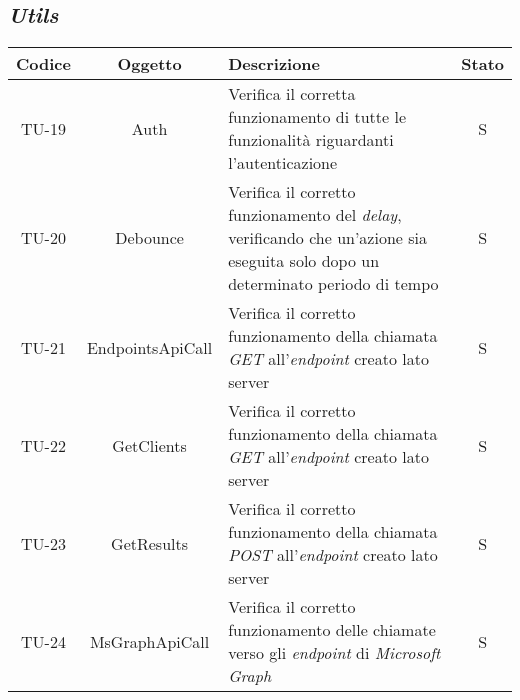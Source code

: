 \subsection*{\emph{Utils}}\label{subsec:test-unita-utils}


\begin{center}
  \label{tab:test-unita-utils}
  \begin{longtable}{|c|c|p{}|c|}
  \hline
  \textbf{Codice} & \textbf{Oggetto} & \textbf{Descrizione} & \textbf{Stato}\\
  \hline
  TU-19 &Auth &Verifica il corretta funzionamento di tutte le funzionalità riguardanti l'autenticazione & S \\
  \hline
  TU-20 &Debounce &Verifica il corretto funzionamento del \textit{delay}, verificando che un'azione sia eseguita solo dopo un determinato periodo di tempo &S \\
  \hline
  TU-21 &EndpointsApiCall &Verifica il corretto funzionamento della chiamata \textit{GET} all'\textit{endpoint} creato lato server &S \\
  \hline
  TU-22 &GetClients &Verifica il corretto funzionamento della chiamata \textit{GET} all'\textit{endpoint} creato lato server  &S \\
  \hline
  TU-23 &GetResults &Verifica il corretto funzionamento della chiamata \textit{POST} all'\textit{endpoint} creato lato server &S \\
  \hline
  TU-24 &MsGraphApiCall &Verifica il corretto funzionamento delle chiamate verso gli \textit{endpoint} di \textit{Microsoft Graph} &S \\
  \hline
\end{longtable}
\end{center}

